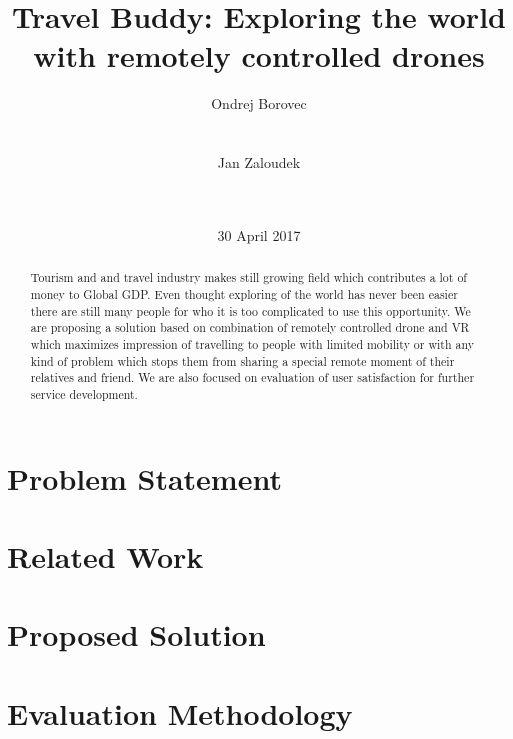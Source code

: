 \documentclass{vldb}
\begin{document}

\title{Travel Buddy: Exploring the world with remotely controlled drones}


\author {
\alignauthor
Ondrej Borovec\\
       \\
       \\
\alignauthor
Jan Zaloudek\\
       \\
       \\
}

\date{30 April 2017}

\maketitle
\begin{abstract}
Tourism and and travel industry makes still growing field which contributes a lot of money to Global GDP. Even thought exploring of the world has never been easier there are still many people for who it is too complicated to use this opportunity. We are proposing a solution based on combination of remotely controlled drone and VR which maximizes impression of travelling to people with limited mobility or with any kind of problem which stops them from sharing a special remote moment of their relatives and friend. We are also focused on evaluation of user satisfaction  for further  service development.
\end{abstract}




\section{Problem Statement}



\section{Related Work}



\section{Proposed Solution}


\section{Evaluation Methodology}



  
\end{document}
